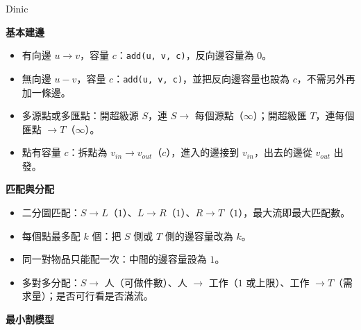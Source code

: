 {\Large Dinic}
\medskip
\setlength{\parindent}{2em}

{\large\bfseries 基本建邊\par}
\medskip
\begin{itemize}
  \item 有向邊 $u \to v$，容量 $c$：\texttt{add(u, v, c)}，反向邊容量為 $0$。
  \item 無向邊 $u - v$，容量 $c$：\texttt{add(u, v, c)}，並把反向邊容量也設為 $c$，不需另外再加一條邊。
  \item 多源點或多匯點：開超級源 $S$，連 $S \to$ 每個源點（$\infty$）；開超級匯 $T$，連每個匯點 $\to T$（$\infty$）。
  \item 點有容量 $c$：拆點為 $v_{in} \to v_{out}$（$c$），進入的邊接到 $v_{in}$，出去的邊從 $v_{out}$ 出發。
\end{itemize}

{\large\bfseries 匹配與分配\par}

\medskip

\begin{itemize}
  \item 二分圖匹配：$S \to L$（$1$）、$L \to R$（$1$）、$R \to T$（$1$），最大流即最大匹配數。
  \item 每個點最多配 $k$ 個：把 $S$ 側或 $T$ 側的邊容量改為 $k$。
  \item 同一對物品只能配一次：中間的邊容量設為 $1$。
  \item 多對多分配：$S \to$ 人（可做件數）、人 $\to$ 工作（$1$ 或上限）、工作 $\to T$（需求量）；是否可行看是否滿流。
\end{itemize}

{\large\bfseries 最小割模型\par}

\medskip

